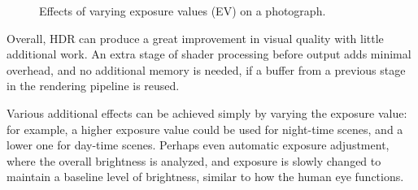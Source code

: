 \documentclass[11pt, oneside]{report}
\begin{document}
\begin{figure}[!htbp]
  \centering
  \hfill
  \hfill
  \hfill
  \hfill
  \caption{Effects of varying exposure values (EV) on a photograph.}
\end{figure}

Overall, HDR can produce a great improvement in visual quality with little additional work. An extra stage of shader processing before output adds minimal overhead, and no additional memory is needed, if a buffer from a previous stage in the rendering pipeline is reused.

Various additional effects can be achieved simply by varying the exposure value: for example, a higher exposure value could be used for night-time scenes, and a lower one for day-time scenes. Perhaps even automatic exposure adjustment, where the overall brightness is analyzed, and exposure is slowly changed to maintain a baseline level of brightness, similar to how the human eye functions.
\end{document}
